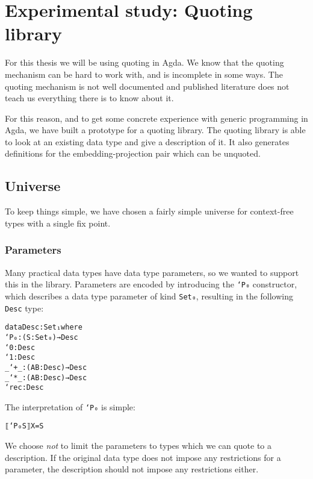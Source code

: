 \section{Experimental study: Quoting library}\label{sec:prototype}

For this thesis we will be using quoting in Agda.
We know that the quoting mechanism can be hard to work with, and is
incomplete in some ways.
The quoting mechanism is not well documented and published literature
does not teach us everything there is to know about it.

For this reason, and to get some concrete experience with generic
programming in Agda, we have built a prototype for a quoting library.
The quoting library is able to look at an existing data type and give
a description of it.
It also generates definitions for the embedding-projection pair which
can be unquoted.

\subsection{Universe}

To keep things simple, we have chosen a fairly simple universe for
context-free types with a single fix
point.

\subsubsection{Parameters}

Many practical data types have data type parameters, so we wanted to
support this in the library.
Parameters are encoded by introducing the \texttt{`P₀} constructor,
which describes a data type parameter of kind \texttt{Set₀}, resulting
in the following \texttt{Desc} type:

\begin{alltt}
data Desc : Set₁ where
  `P₀ : (S : Set₀) → Desc
  `0 : Desc
  `1 : Desc
  _`+_ : (A B : Desc) → Desc
  _`*_ : (A B : Desc) → Desc
  `rec : Desc
\end{alltt}

The interpretation of \texttt{`P₀} is simple:

\begin{alltt}
⟦ `P₀ S ⟧ X = S
\end{alltt}

\begin{remark}
We choose \emph{not} to limit the parameters to types which we can
quote to a description.
If the original data type does not impose any restrictions for a
parameter, the description should not impose any restrictions either.
\end{remark}

